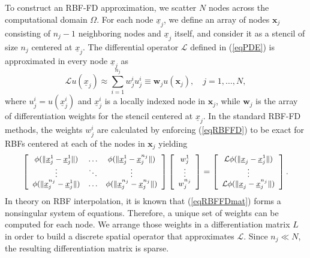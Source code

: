 \documentclass{UUThesisTemplate}
\begin{document}
\par To construct an RBF-FD approximation, we scatter $N$ nodes across the computational domain $\Omega$. For each node $\underline{x}_j$, we define an array of nodes $\mathbf{x}_j$ consisting of $n_j-1$ neighboring nodes and $\underline{x}_j$ itself, and consider it as a stencil of size $n_j$ centered at $\underline{x}_j$. The differential operator $\mathcal{L}$ defined in (\ref{eqPDE})  is approximated in every node  $\underline{x}_j$ as
\begin{equation}
\mathcal{L}u(\underline{x}_j)\approx\sum_{i=1}^{n_j}{w}_{j}^{i}u_j^{i}\equiv \mathbf{w}_ju(\mathbf{x}_j),\quad j=1,\ldots,N,
\label{eqRBFFD}
\end{equation}
where $u_j^{i}=u(\underline{x}_j^i)$ and $\underline{x}_j^i$ is a locally indexed node in $\mathbf{x}_j$, while $\mathbf{w}_j$ is the array of differentiation weights for the stencil centered at $\underline{x}_j$. In the standard RBF-FD methods, the weights ${w}_j^i$ are calculated by enforcing (\ref{eqRBFFD}) to be exact for RBFs centered at each of the nodes in $\mathbf{x}_j$ yielding
\begin{equation}
\label{eqRBFFDmat}
{\footnotesize{
\left[\begin{array}{cccc}
\phi(\|\underline{x}_j^{1}-\underline{x}_j^{1}\|) & \ldots & \phi(\|\underline{x}_j^{1}-\underline{x}_{j}^{n_j}\|)\\
\vdots & \ddots & \vdots\\
\phi(\|\underline{x}_{j}^{n_j}-\underline{x}_j^{1}\|) & \ldots & \phi(\|\underline{x}_{j}^{n_j}-\underline{x}_{j}^{n_j}\|)
\end{array}\right]
\left[\begin{array}{c}
{w}_j^{1}\\
\vdots\\
{w}_{j}^{n_j}
\end{array}\right]=
\left[\begin{array}{c}
\mathcal{L}\phi(\|\underline{x}_{j}-\underline{x}_j^{1}\|)\\
\vdots \\
\mathcal{L}\phi(\|\underline{x}_{j}-\underline{x}_{{j}}^{n_j}\|)
\end{array}\right].}}
\end{equation}
In theory on RBF interpolation, it is known that (\ref{eqRBFFDmat}) forms a nonsingular system of equations. Therefore, a unique set of weights can be computed for each node. We arrange those weights in a differentiation matrix $L$ in order to build a discrete spatial operator that approximates $\mathcal{L}$. Since $n_j \ll N$, the resulting differentiation matrix is sparse.
\end{document}
